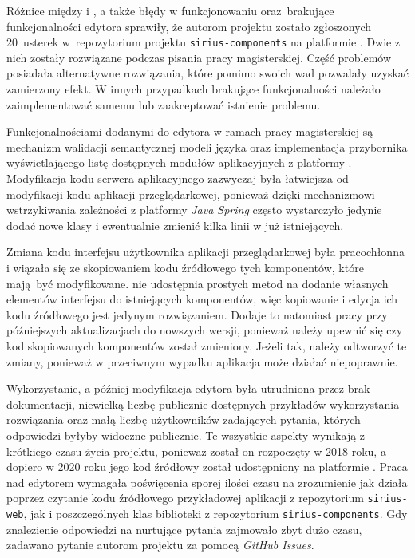 Różnice między \SiriusWeb{} i \SiriusDesktop{}, a także błędy w
funkcjonowaniu oraz~brakujące funkcjonalności edytora sprawiły, że autorom
projektu zostało zgłoszonych 20~usterek w~repozytorium projektu
\texttt{sirius-components} na platformie \GitHub{}. Dwie z nich zostały
rozwiązane podczas pisania pracy magisterskiej. Część problemów posiadała
alternatywne rozwiązania, które pomimo swoich wad pozwalały uzyskać zamierzony
efekt. W innych przypadkach brakujące funkcjonalności należało zaimplementować
samemu lub zaakceptować istnienie problemu.

Funkcjonalnościami dodanymi do edytora w ramach pracy magisterskiej są
mechanizm walidacji semantycznej modeli języka \CAL{} oraz implementacja
przybornika wyświetlającego listę dostępnych modułów aplikacyjnych z platformy
\BalticLSC{}. Modyfikacja kodu serwera aplikacyjnego zazwyczaj była
łatwiejsza od modyfikacji kodu aplikacji przeglądarkowej, ponieważ dzięki
mechanizmowi wstrzykiwania zależności z platformy \emph{Java Spring}
często wystarczyło jedynie dodać nowe klasy i ewentualnie zmienić kilka linii w
już istniejących.

Zmiana kodu interfejsu użytkownika aplikacji przeglądarkowej była pracochłonna
i wiązała się ze skopiowaniem kodu źródłowego tych komponentów, które mają być
modyfikowane. \SiriusWeb{} nie udostępnia prostych metod na dodanie
własnych elementów interfejsu do istniejących komponentów, więc kopiowanie i
edycja ich kodu źródłowego jest jedynym rozwiązaniem. Dodaje to natomiast pracy
przy późniejszych aktualizacjach do nowszych wersji, ponieważ należy upewnić
się
czy kod skopiowanych komponentów został zmieniony. Jeżeli tak, należy odtworzyć
te zmiany, ponieważ w przeciwnym wypadku aplikacja może działać niepoprawnie.

Wykorzystanie, a później modyfikacja edytora \SiriusWeb{} była utrudniona
przez brak dokumentacji, niewielką liczbę publicznie dostępnych przykładów
wykorzystania rozwiązania oraz małą liczbę użytkowników zadających pytania,
których odpowiedzi byłyby widoczne publicznie. Te wszystkie aspekty wynikają z
krótkiego czasu życia projektu, ponieważ został on rozpoczęty w 2018 roku, a
dopiero w 2020 roku jego kod źródłowy został udostępniony na platformie
\GitHub{}. Praca nad edytorem wymagała poświęcenia sporej ilości czasu na
zrozumienie jak \SiriusWeb{} działa poprzez czytanie kodu źródłowego
przykładowej aplikacji z repozytorium \texttt{sirius-web}, jak i poszczególnych
klas biblioteki z repozytorium \texttt{sirius-components}. Gdy znalezienie
odpowiedzi na nurtujące pytania zajmowało zbyt dużo czasu, zadawano pytanie
autorom projektu za pomocą \emph{GitHub Issues}.

